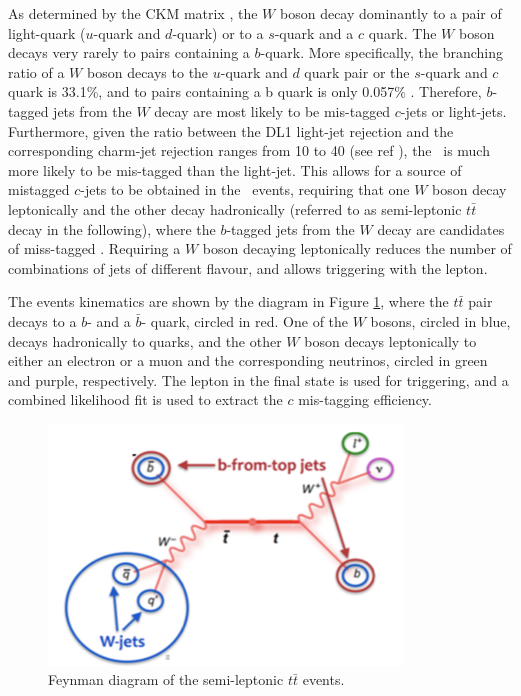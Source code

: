 \documentclass[letterpaper,12pt]{article}
\begin{document}
As determined by the CKM matrix \cite{CKM1,CKM2}, the $W$ boson decay dominantly to 
a pair of light-quark ($u$-quark and $d$-quark) or to
a $s$-quark and a $c$ quark. The $W$ boson decays very rarely to pairs containing a $b$-quark. 
More specifically, the branching ratio of a $W$ boson decays to the $u$-quark and $d$ quark pair or 
the $s$-quark and $c$ quark is 33.1\%, and to pairs containing a b quark is only 0.057\% \cite{PDG}. 
Therefore, $b$-tagged jets from the $W$ decay are most likely 
to be mis-tagged $c$-jets or light-jets. 
Furthermore, given the ratio between the DL1 light-jet rejection and the corresponding charm-jet rejection 
ranges from 10 to 40 (see ref \cite{ATL-PHYS-PUB-2017-013}), the 
\cjet\ is much more likely to be mis-tagged than the light-jet. 
This allows for a source of mistagged $c$-jets to be obtained in the \ttbar\ events, 
requiring that one $W$ boson decay leptonically and the other decay hadronically 
(referred to as semi-leptonic $t\bar{t}$ decay in the following),
where the $b$-tagged jets from the $W$ decay are candidates of miss-tagged \cjet.
Requiring a $W$ boson decaying leptonically 
reduces the number of combinations of jets of different flavour, 
and allows triggering with the lepton.

The events kinematics are shown by the diagram in 
Figure \ref{fig:feynman}, where the $t\bar{t}$ pair decays to a 
$b$- and a $\bar{b}$- quark, circled in red. One of the $W$ bosons, 
circled in blue, decays hadronically to quarks, 
and the other $W$ boson decays leptonically to either 
an electron or a muon and the corresponding neutrinos, 
circled in green and purple, respectively. The lepton in the final state is used for 
triggering, and a combined likelihood fit is used to extract the $c$ mis-tagging 
efficiency.

\begin{figure}[H]
\centering
\includegraphics[width=.45\textwidth]{feynman.png}
\caption{Feynman diagram of the semi-leptonic $t\bar{t}$ events.}
\label{fig:feynman}
\end{figure}

\end{document}
